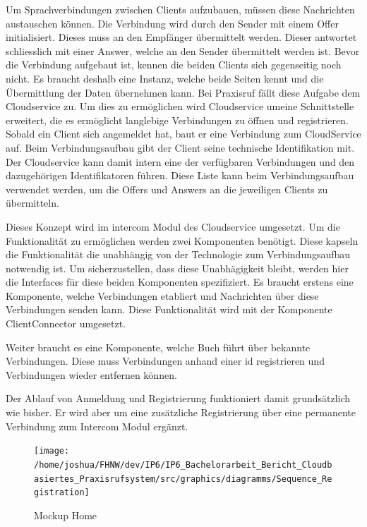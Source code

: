 Um Sprachverbindungen zwischen Clients aufzubauen, müssen diese Nachrichten austauschen können.
Die Verbindung wird durch den Sender mit einem Offer initialisiert.
Dieses muss an den Empfänger übermittelt werden.
Dieser antwortet schliesslich mit einer Answer, welche an den Sender übermittelt werden ist.
Bevor die Verbindung aufgebaut ist, kennen die beiden Clients sich gegenseitig noch nicht.
Es braucht deshalb eine Instanz, welche beide Seiten kennt und die Übermittlung der Daten übernehmen kann.
Bei Praxisruf fällt diese Aufgabe dem Cloudservice zu.
Um dies zu ermöglichen wird Cloudservice umeine Schnittstelle erweitert, die es ermöglicht langlebige Verbindungen
zu öffnen und registrieren.
Sobald ein Client sich angemeldet hat, baut er eine Verbindung zum CloudService auf.
Beim Verbindungsaufbau gibt der Client seine technische Identifikation mit.
Der Cloudservice kann damit intern eine der verfügbaren Verbindungen und den dazugehörigen Identifikatoren führen.
Diese Liste kann beim Verbindungsaufbau verwendet werden, um die Offers und Answers an die jeweiligen Clients zu übermitteln.

Dieses Konzept wird im intercom Modul des Cloudservice umgesetzt.
Um die Funktionalität zu ermöglichen werden zwei Komponenten benötigt.
Diese kapseln die Funktionalität die unabhängig von der Technologie zum Verbindungsaufbau notwendig ist.
Um sicherzustellen, dass diese Unabhägigkeit bleibt, werden hier die Interfaces für diese beiden Komponenten spezifiziert.
Es braucht erstens eine Komponente, welche Verbindungen etabliert und Nachrichten über diese Verbindungen senden kann.
Diese Funktionalität wird mit der Komponente ClientConnector umgesetzt.




\clearpage
Weiter braucht es eine Komponente, welche Buch führt über bekannte Verbindungen.
Diese muss Verbindungen anhand einer id registrieren und Verbindungen wieder entfernen können.



Der Ablauf von Anmeldung und Registrierung funktioniert damit grundsätzlich wie bisher.
Er wird aber um eine zusätzliche Registrierung über eine permanente Verbindung zum Intercom Modul ergänzt.

\begin{figure}[h]
    \centering
    \begin{minipage}[b]{0.9\textwidth}
        \texttt{[image: /home/joshua/FHNW/dev/IP6/IP6\_Bachelorarbeit\_Bericht\_Cloudbasiertes\_Praxisrufsystem/src/graphics/diagramms/Sequence\_Registration]}
        \caption{Mockup Home}
    \end{minipage}
\end{figure}


